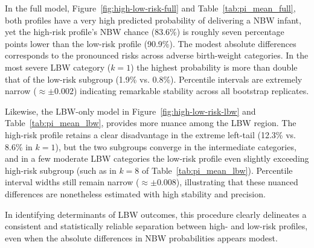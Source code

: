 In the full model, Figure~\ref{fig:high-low-risk-full} and Table~\ref{tab:pi_mean_full}, both profiles have a very high predicted probability of delivering a NBW infant, yet the high-risk profile’s NBW chance (83.6\%) is roughly seven percentage points lower than the low-risk profile (90.9\%). The modest absolute differences corresponds to the pronounced risks across adverse birth-weight categories. In the most severe LBW category (\(k=1\)) the highest probability is more than double that of the low-risk subgroup (1.9\% vs. 0.8\%). Percentile intervals are extremely narrow (\(\approx \pm 0.002\)) indicating remarkable stability across all bootstrap replicates. 

Likewise, the LBW-only model in Figure~\ref{fig:high-low-risk-lbw} and Table~\ref{tab:pi_mean_lbw}, provides more nuance among the LBW region. The high-risk profile retains a clear disadvantage in the extreme left-tail (12.3\% vs. 8.6\% in \(k=1\)), but the two subgroups converge in the intermediate categories, and in a few moderate LBW categories the low-risk profile even slightly exceeding high-risk subgroup (such as in \(k=8\) of Table~\ref{tab:pi_mean_lbw}). Percentile interval widths still remain narrow (\(\approx \pm 0.008\)), illustrating that these nuanced differences are nonetheless estimated with high stability and precision. 

In identifying determinants of LBW outcomes, this procedure clearly delineates a consistent and statistically reliable separation between high- and low-risk profiles, even when the absolute differences in NBW probabilities appears modest.
